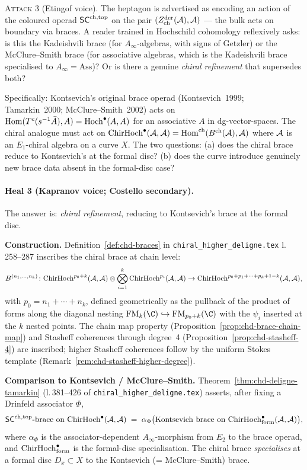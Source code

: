 \textsc{Attack 3} (Etingof voice). The heptagon is advertised as encoding an action of the coloured operad $\mathsf{SC}^{\mathrm{ch},\mathrm{top}}$ on the pair $(Z^{\mathrm{der}}_{\mathrm{ch}}(\mathcal{A}), \mathcal{A})$ --- the bulk acts on boundary via braces. A reader trained in Hochschild cohomology reflexively asks: is this the Kadeishvili brace (for $A_\infty$-algebras, with signs of Getzler) or the McClure--Smith brace (for associative algebras, which is the Kadeishvili brace specialised to $A_\infty = \mathrm{Ass}$)? Or is there a genuine \emph{chiral refinement} that supersedes both?

Specifically: Kontsevich's original brace operad (Kontsevich~1999; Tamarkin~2000; McClure--Smith~2002) acts on $\mathrm{Hom}(T^c(s^{-1}\bar A), A) = \mathrm{Hoch}^\bullet(A, A)$ for an associative $A$ in dg-vector-spaces. The chiral analogue must act on $\mathrm{ChirHoch}^\bullet(\mathcal{A}, \mathcal{A}) = \mathrm{Hom}^{\mathrm{ch}}(B^{\mathrm{ch}}(\mathcal{A}), \mathcal{A})$ where $\mathcal{A}$ is an $E_1$-chiral algebra on a curve $X$. The two questions: (a) does the chiral brace reduce to Kontsevich's at the formal disc? (b) does the curve introduce genuinely new brace data absent in the formal-disc case?

\paragraph{Heal 3 (Kapranov voice; Costello secondary).} The answer is: \emph{chiral refinement}, reducing to Kontsevich's brace at the formal disc.

\textbf{Construction.} Definition~\ref*{def:chd-braces} in \texttt{chiral\_higher\_deligne.tex} l.\,258--287 inscribes the chiral brace at chain level:
\[
B^{(n_1, \ldots, n_k)}\colon \mathrm{ChirHoch}^{p_0 + k}(\mathcal{A}, \mathcal{A}) \otimes \bigotimes_{i = 1}^k \mathrm{ChirHoch}^{p_i}(\mathcal{A}, \mathcal{A}) \to \mathrm{ChirHoch}^{p_0 + p_1 + \cdots + p_k + 1 - k}(\mathcal{A}, \mathcal{A}),
\]
with $p_0 = n_1 + \cdots + n_k$, defined geometrically as the pullback of the product of forms along the diagonal nesting $\FM_k(\C) \hookrightarrow \FM_{p_0 + k}(\C)$ with the $\psi_i$ inserted at the $k$ nested points. The chain map property (Proposition~\ref*{prop:chd-brace-chain-map}) and Stasheff coherences through degree~4 (Proposition~\ref*{prop:chd-stasheff-4}) are inscribed; higher Stasheff coherences follow by the uniform Stokes template (Remark~\ref*{rem:chd-stasheff-higher-degree}).

\textbf{Comparison to Kontsevich / McClure--Smith.} Theorem~\ref*{thm:chd-deligne-tamarkin} (l.\,381--426 of \texttt{chiral\_higher\_deligne.tex}) asserts, after fixing a Drinfeld associator $\Phi$,
\[
\mathsf{SC}^{\mathrm{ch},\mathrm{top}}\text{-brace on } \mathrm{ChirHoch}^\bullet(\mathcal{A}, \mathcal{A})
\;=\;
\alpha_\Phi\bigl(\text{Kontsevich brace on } \mathrm{ChirHoch}^\bullet_{\mathrm{form}}(\mathcal{A}, \mathcal{A})\bigr),
\]
where $\alpha_\Phi$ is the associator-dependent $A_\infty$-morphism from $E_2$ to the brace operad, and $\mathrm{ChirHoch}^\bullet_{\mathrm{form}}$ is the formal-disc specialisation. The chiral brace \emph{specialises} at a formal disc $D_x \subset X$ to the Kontsevich (= McClure--Smith) brace.

